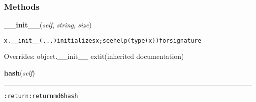   \subsubsection{Methods}

    \vspace{0.5ex}

\hspace{.8\funcindent}\begin{boxedminipage}{\funcwidth}

    \raggedright \textbf{\_\_init\_\_}(\textit{self}, \textit{string}, \textit{size})

\setlength{\parskip}{2ex}
\begin{alltt}
x.\_\_init\_\_(...) initializes x; see help(type(x)) for signature
\end{alltt}

\setlength{\parskip}{1ex}
      Overrides: object.\_\_init\_\_ 	extit{(inherited documentation)}

    \end{boxedminipage}

    \label{hal:maths:crypt:MD6:hash}

    \vspace{0.5ex}

\hspace{.8\funcindent}\begin{boxedminipage}{\funcwidth}

    \raggedright \textbf{hash}(\textit{self})

    \vspace{-1.5ex}

    \rule{\textwidth}{0.5\fboxrule}
\setlength{\parskip}{2ex}
\begin{alltt}

:return: return md6 hash
\end{alltt}

\setlength{\parskip}{1ex}
    \end{boxedminipage}

    \label{hal:maths:crypt:MD6:hex}

    \vspace{0.5ex}

